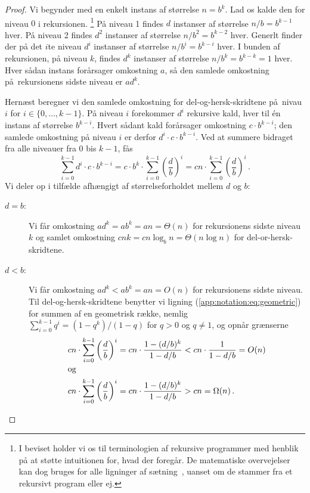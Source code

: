 \begin{proof} 
  Vi begynder med en enkelt instans af størrelse $n = b^k$. 
  Lad os kalde den for niveau $0$ i rekursionen.%
  \footnote{I beviset holder vi os til terminologien af rekursive programmer med henblik på at støtte intuitionen for, hvad der foregår.
  De matematiske overvejelser kan dog bruges for alle ligninger af sætning~, uanset om de stammer fra et rekursivt program eller ej.}
  På niveau 1 findes $d$ instanser af størrelse $n/b = b^{k - 1}$ hver.
  På niveau 2 findes  $d^2$ instanser af størrelse $n/b^2 = b^{k - 2}$ hver.
  Generlt finder der på det $i$te niveau  $d^i$ instanser af størrelse $n/b^i = b^{k - i}$ hver.
  I bunden af rekursionen, på niveau $k$, findes $d^k$ instanser af størrelse $n/b^k = b^{k - k} = 1$ hver.
  Hver sådan instans forårsager omkostning $a$, så den samlede omkostning på rekursionens sidste niveau er $ad^k$.

  Hernæst beregner vi den samlede omkostning for del-og-hersk-skridtene på nivau $i$ for $i\in\{0,\ldots, k - 1\}$. 
  På niveau $i$ forekommer $d^i$ rekursive kald, hver til én instans af størrelse $b^{k-i}$. 
  Hvert sådant kald forårsager omkostning $ c \cdot b^{k - i}$;
  den samlede omkostning på niveau $i$ er derfor $d^i\cdot c\cdot b^{k-i}$. 
  Ved at summere bidraget fra alle niveauer fra $0$ bis $k-1$, fås
  \[ \sum_{i=0}^{k-1}d^i\cdot c\cdot b^{k-i}=
  c\cdot
  b^k \cdot \sum_{i=0}^{k-1}\left(\frac{d}{b}\right)^i=cn \cdot \sum_{i=0}^{k-1}\left(\frac{d}{b}\right)^i\,.
  \]
  Vi deler op i tilfælde afhængigt af størrelseforholdet mellem $d$ og $b$:
  \begin{description}
    \item[$d=b$:]
      Vi får omkostning $ad^k=ab^k=an=\Theta(n)$ for rekursionens sidste niveau $k$ og
      samlet omkostning $cnk=cn\log_{b}n=\Theta(n\log n)$ for del-or-hersk-skridtene.

\item[$d<b$:] Vi får omkostning $ad^k<ab^k=an=O(n)$ for rekursionens sidste niveau.
  Til del-og-hersk-skridtene benytter vi ligning (\ref{app:notation:eq:geometric}) for summen af en geometrisk række,
  nemlig $\sum_{i=0}^{k-1} q^i = (1 - q^k)/(1 - q)$ for
  $q > 0$ og $q \not= 1$, og opnår grænserne
  \begin{align*}
    cn \cdot \sum_{i=0}^{k-1}\left(\frac{d}{b}\right)^i & = cn \cdot
    \frac{1-(d/b)^k}{1-d/b} < cn \cdot \frac{1}{1-d/b} =O(n)\\
    \intertext{og}      %
    cn \cdot \sum_{i=0}^{k-1}\left(\frac{d}{b}\right)^i &= cn \cdot
    \frac{1-(d/b)^k}{1-d/b}>cn =\Omega(n)\,.
  \end{align*}


\end{description}
\end{proof}
